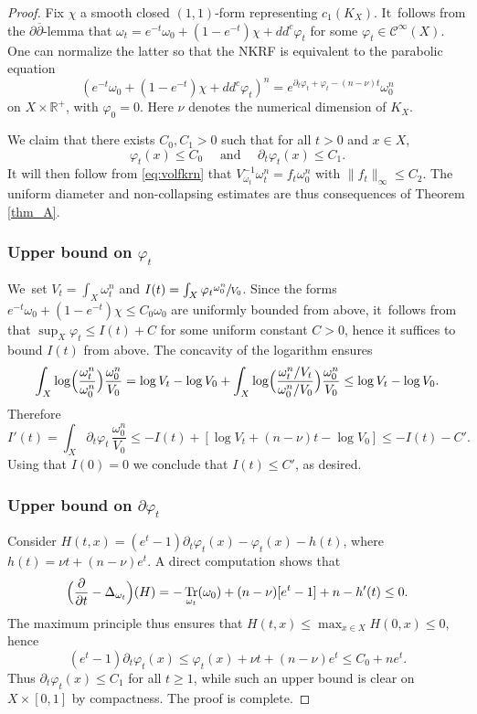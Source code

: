 \documentclass[10pt]{amsart}
\DeclareMathOperator{\Tr}{Tr}
\theoremstyle{definition}
\newcommand{\R}{\mathbb R}
\let\f\varphi
\begin{document}
\begin{proof}
Fix $\chi$ a smooth closed $(1,1)$-form representing $c_1(K_X)$. It~follows from the $\partial\overline{\partial}$-lemma
that $\omega_t=e^{-t}\omega_0+(1-e^{-t}) \chi+dd^c \f_t$ for some $\f_t \in {\mathcal C}^{\infty}(X)$. One can normalize
the latter so that the NKRF is equivalent to the parabolic equation
\[
(e^{-t}\omega_0+(1-e^{-t}) \chi+dd^c \f_t)^n=e^{\partial_t \f_t+\f_t-(n-\nu)t} \omega_0^n
\]
on $X \times \R^+$, with $\f_0=0$. Here $\nu$ denotes the numerical dimension of $K_X$.

We claim that there exists $C_0,C_1>0$ such that for all $t>0$ and $x \in X$,
\[
\f_t(x) \leq C_0
\quad \text{ and } \quad
\partial_t \f_t(x) \leq C_1.
\]
It will then follow from \eqref{eq:volfkrn} that $V_{\omega_t}^{-1}\omega_t^n=f_t \omega_0^n$ with
$\|f_t\|_{\infty} \leq C_2$. The uniform diameter and non-collapsing estimates are thus consequences
of Theorem \ref{thm_A}.

\subsubsection*{Upper bound on $\f_t$}
We~set $V_t=\int_X \omega_t^n$ and $I(t)=\int_X \f_t \sfrac{\omega_0^n}{V_0}$.
Since the forms $e^{-t} \omega_0 +(1-e^{-t}) \chi \leq C_0 \omega_0$
are uniformly bounded from above, it~follows from \cite[Prop.\,8.5]{GZbook} that
$\sup_X \f_t \leq I(t)+C$ for some uniform constant $C>0$, hence it suffices to bound
$I(t)$ from above. The concavity of the logarithm ensures
\[
\int_X \log \Bigl( \frac{\omega_t^n}{\omega_0^n} \Bigr) \frac{\omega_0^n}{V_0}
=\log V_t-\log V_0 + \int_X \log \Bigl( \frac{\omega_t^n/V_t}{\omega_0^n/V_0} \Bigr) \frac{\omega_0^n}{V_0}
\leq \log V_t-\log V_0.
\]
Therefore
\[
I'(t)=\int_X \partial_t \f_t\, \frac{\omega_0^n}{V_0} \leq -I(t)+
[\log V_t+(n-\nu)t-\log V_0]\leq -I(t)-C'.
\]
Using that $I(0)=0$ we conclude that $I(t) \leq C'$, as desired.

\subsubsection*{Upper bound on $\partial\f_t$}
Consider $H(t,x)=(e^t-1) \partial_t \f_t(x)-\f_t(x)-h(t)$, where
$h(t)=\nu t+(n-\nu)e^t$. A direct computation shows that
\[
\Bigl( \frac{\partial}{\partial t}-\Delta_{\omega_t} \Bigr)(H)=-\Tr_{\omega_t}(\omega_0)
+(n-\nu)[e^t-1] +n-h'(t) \leq 0.
\]
The maximum principle thus ensures that $H(t,x) \leq \max_{x \in X} H(0,x) \leq 0$, hence
\[
(e^t-1) \partial_t \f_t(x) \leq \f_t(x)+\nu t +(n-\nu)e^t \leq C_0+ne^t.
\]
Thus $\partial_t \f_t(x) \leq C_1$ for all $t \geq 1$, while such an upper bound is
clear on $X \times [0,1]$ by compactness.
The proof is complete.
\end{proof}
\end{document}
